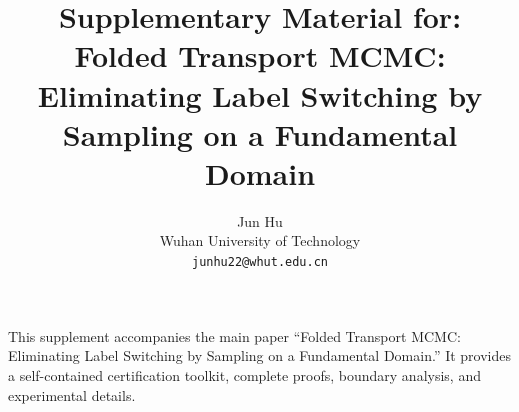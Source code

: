 \documentclass[a4paper,12pt]{article}
\title{Supplementary Material for:\\
  Folded Transport MCMC: Eliminating Label Switching
  by Sampling on a Fundamental Domain}
\author{Jun Hu \\
  {\small Wuhan University of Technology} \\
  {\small \texttt{junhu22@whut.edu.cn}}}
\date{}
\theoremstyle{definition}
\theoremstyle{remark}
\begin{document}
\maketitle

\noindent
This supplement accompanies the main paper ``Folded Transport
MCMC: Eliminating Label Switching by Sampling on a Fundamental
Domain.''  It provides a self-contained certification
toolkit, complete proofs, boundary analysis, and experimental
details.

\bigskip




\end{document}

